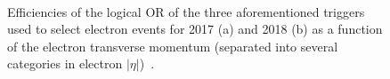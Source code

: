 \begin{figure}[hbtp]
\begin{center}
   \\
    \caption{Efficiencies of the logical OR of the three aforementioned triggers used to select electron events for 2017 (a) and 2018 (b) as a function of the electron transverse momentum (separated into several categories in electron $|\eta|$)~\cite{note:AN_19_257}.}
    \label{fig:hlteff_electron}
 \end{center}
 \end{figure}


